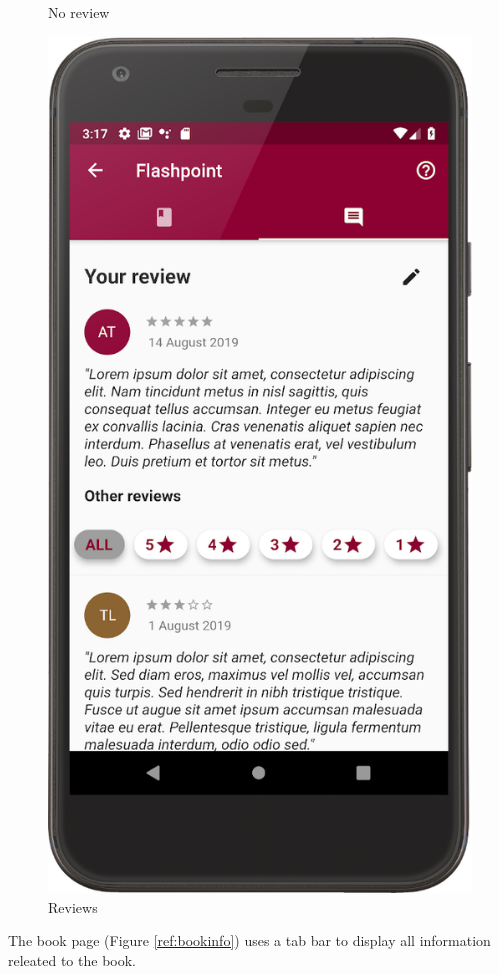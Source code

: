 \begin{figure}[!htb]
\begin{minipage}[b]{0.3\textwidth}
        \caption{No review}
        \label{ref:noreview}
    \end{minipage}
    \hfill
    \begin{minipage}[b]{0.3\textwidth}
        \centering
        \includegraphics[scale=1]{images/reviews-page.png}
        \caption{Reviews}
        \label{ref:reviewspage}
    \end{minipage}
\end{figure}
The book page (Figure \ref{ref:bookinfo}) uses a tab bar to display all information releated to the book.

